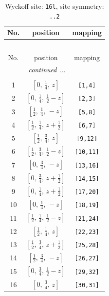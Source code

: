 \documentclass[fleqn,8pt]{jsarticle}
\begin{document}
\renewcommand{\arraystretch}{1.2}
\begin{longtable}{ccc}
\caption{Wyckoff site: {\tt 16l}, site symmetry: {\tt ..2}}
 \\
 \hline \hline
No. & position & mapping \\ \hline \endfirsthead

\multicolumn{2}{l}{\tablename\ \thetable{}} \\
 \hline \hline
No. & position & mapping \\ \hline \endhead

 \hline \hline
\multicolumn{2}{r}{\footnotesize\it continued ...} \\ \endfoot

 \hline \hline
\multicolumn{2}{r}{} \\ \endlastfoot

1 & $\left[ 0,\, \frac{1}{4},\, z \right]$ & {\tt [1,4]} \\ \hline
2 & $\left[ 0,\, \frac{1}{4},\, \frac{1}{2} - z \right]$ & {\tt [2,3]} \\ \hline
3 & $\left[ \frac{1}{2},\, \frac{1}{4},\, - z \right]$ & {\tt [5,8]} \\ \hline
4 & $\left[ \frac{1}{2},\, \frac{1}{4},\, z + \frac{1}{2} \right]$ & {\tt [6,7]} \\ \hline
5 & $\left[ \frac{1}{2},\, \frac{3}{4},\, z \right]$ & {\tt [9,12]} \\ \hline
6 & $\left[ \frac{1}{2},\, \frac{3}{4},\, \frac{1}{2} - z \right]$ & {\tt [10,11]} \\ \hline
7 & $\left[ 0,\, \frac{3}{4},\, - z \right]$ & {\tt [13,16]} \\ \hline
8 & $\left[ 0,\, \frac{3}{4},\, z + \frac{1}{2} \right]$ & {\tt [14,15]} \\ \hline
9 & $\left[ 0,\, \frac{1}{4},\, z + \frac{1}{2} \right]$ & {\tt [17,20]} \\ \hline
10 & $\left[ 0,\, \frac{1}{4},\, - z \right]$ & {\tt [18,19]} \\ \hline
11 & $\left[ \frac{1}{2},\, \frac{1}{4},\, \frac{1}{2} - z \right]$ & {\tt [21,24]} \\ \hline
12 & $\left[ \frac{1}{2},\, \frac{1}{4},\, z \right]$ & {\tt [22,23]} \\ \hline
13 & $\left[ \frac{1}{2},\, \frac{3}{4},\, z + \frac{1}{2} \right]$ & {\tt [25,28]} \\ \hline
14 & $\left[ \frac{1}{2},\, \frac{3}{4},\, - z \right]$ & {\tt [26,27]} \\ \hline
15 & $\left[ 0,\, \frac{3}{4},\, \frac{1}{2} - z \right]$ & {\tt [29,32]} \\ \hline
16 & $\left[ 0,\, \frac{3}{4},\, z \right]$ & {\tt [30,31]} \\
\end{longtable}
\end{document}
